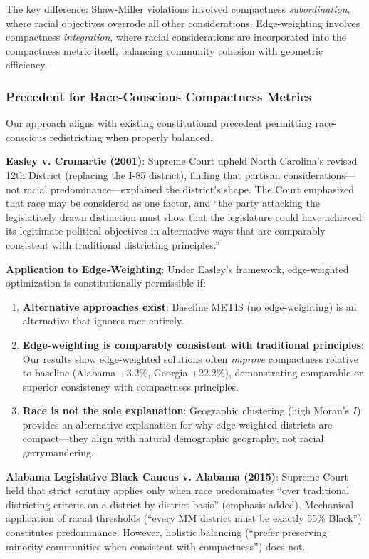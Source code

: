 The key difference: Shaw-Miller violations involved compactness \emph{subordination}, where racial objectives overrode all other considerations. Edge-weighting involves compactness \emph{integration}, where racial considerations are incorporated into the compactness metric itself, balancing community cohesion with geometric efficiency.

\subsubsection{Precedent for Race-Conscious Compactness Metrics}

Our approach aligns with existing constitutional precedent permitting race-conscious redistricting when properly balanced.

\textbf{Easley v. Cromartie (2001)}: Supreme Court upheld North Carolina's revised 12th District (replacing the I-85 district), finding that partisan considerations---not racial predominance---explained the district's shape. The Court emphasized that race may be considered as one factor, and ``the party attacking the legislatively drawn distinction must show that the legislature could have achieved its legitimate political objectives in alternative ways that are comparably consistent with traditional districting principles.''

\textbf{Application to Edge-Weighting}: Under Easley's framework, edge-weighted optimization is constitutionally permissible if:
\begin{enumerate}
    \item \textbf{Alternative approaches exist}: Baseline METIS (no edge-weighting) is an alternative that ignores race entirely.
    \item \textbf{Edge-weighting is comparably consistent with traditional principles}: Our results show edge-weighted solutions often \emph{improve} compactness relative to baseline (Alabama +3.2\%, Georgia +22.2\%), demonstrating comparable or superior consistency with compactness principles.
    \item \textbf{Race is not the sole explanation}: Geographic clustering (high Moran's $I$) provides an alternative explanation for why edge-weighted districts are compact---they align with natural demographic geography, not racial gerrymandering.
\end{enumerate}

\textbf{Alabama Legislative Black Caucus v. Alabama (2015)}: Supreme Court held that strict scrutiny applies only when race predominates ``over traditional districting criteria on a district-by-district basis'' (emphasis added). Mechanical application of racial thresholds (``every MM district must be exactly 55\% Black'') constitutes predominance. However, holistic balancing (``prefer preserving minority communities when consistent with compactness'') does not.

